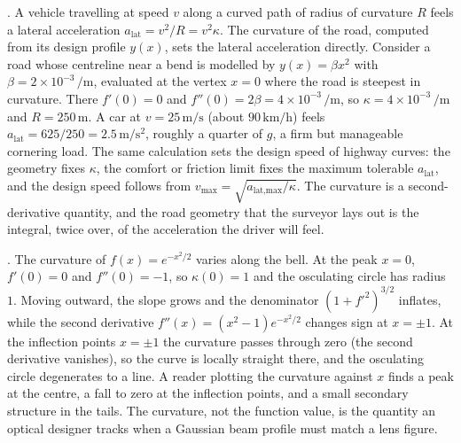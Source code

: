 . A vehicle travelling at
speed $v$ along a curved path of radius of curvature $R$ feels a
lateral acceleration $a_{\text{lat}} = v^{2}/R = v^{2} \kappa$. The
curvature of the road, computed from its design profile $y(x)$,
sets the lateral acceleration directly. Consider a road whose
centreline near a bend is modelled by $y(x) = \beta x^{2}$ with
$\beta = 2 \times 10^{-3}\,\si{\per\meter}$, evaluated at the
vertex $x = 0$ where the road is steepest in curvature. There
$f'(0) = 0$ and $f''(0) = 2\beta = 4 \times 10^{-3}\,\si{\per
\meter}$, so $\kappa = 4 \times 10^{-3}\,\si{\per\meter}$ and $R =
250\,\si{\meter}$. A car at $v = 25\,\si{\meter\per\second}$
(about $90\,\si{\kilo\meter\per\hour}$) feels $a_{\text{lat}} =
625/250 = 2.5\,\si{\meter\per\second\squared}$, roughly a quarter
of $g$, a firm but manageable cornering load. The same calculation
sets the design speed of highway curves: the geometry fixes
$\kappa$, the comfort or friction limit fixes the maximum
tolerable $a_{\text{lat}}$, and the design speed follows from
$v_{\max} = \sqrt{a_{\text{lat,max}}/\kappa}$. The curvature is a
second-derivative quantity, and the road geometry that the
surveyor lays out is the integral, twice over, of the
acceleration the driver will feel.

. The
curvature of $f(x) = e^{-x^{2}/2}$ varies along the bell. At the
peak $x = 0$, $f'(0) = 0$ and $f''(0) = -1$, so $\kappa(0) = 1$
and the osculating circle has radius $1$. Moving outward, the
slope grows and the denominator $(1 + f'^{2})^{3/2}$ inflates,
while the second derivative $f''(x) = (x^{2} - 1)e^{-x^{2}/2}$
changes sign at $x = \pm 1$. At the inflection points $x = \pm 1$
the curvature passes through zero (the second derivative
vanishes), so the curve is locally straight there, and the
osculating circle degenerates to a line. A reader plotting the
curvature against $x$ finds a peak at the centre, a fall to zero
at the inflection points, and a small secondary structure in the
tails. The curvature, not the function value, is the quantity an
optical designer tracks when a Gaussian beam profile must match a
lens figure.

